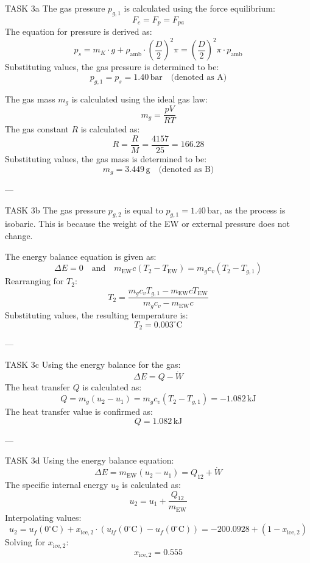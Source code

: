 TASK 3a  
The gas pressure \( p_{g,1} \) is calculated using the force equilibrium:  
\[
F_c = F_p = F_{pa}
\]  
The equation for pressure is derived as:  
\[
p_s = m_K \cdot g + \rho_{\text{amb}} \cdot \left( \frac{D}{2} \right)^2 \pi = \left( \frac{D}{2} \right)^2 \pi \cdot p_{\text{amb}}
\]  
Substituting values, the gas pressure is determined to be:  
\[
p_{g,1} = p_s = 1.40 \, \text{bar} \quad \text{(denoted as A)}  
\]  

The gas mass \( m_g \) is calculated using the ideal gas law:  
\[
m_g = \frac{p V}{R T}  
\]  
The gas constant \( R \) is calculated as:  
\[
R = \frac{R}{M} = \frac{4157}{25} = 166.28  
\]  
Substituting values, the gas mass is determined to be:  
\[
m_g = 3.449 \, \text{g} \quad \text{(denoted as B)}  
\]  

---

TASK 3b  
The gas pressure \( p_{g,2} \) is equal to \( p_{g,1} = 1.40 \, \text{bar} \), as the process is isobaric. This is because the weight of the EW or external pressure does not change.  

The energy balance equation is given as:  
\[
\Delta E = 0 \quad \text{and} \quad m_{\text{EW}} c (T_2 - T_{\text{EW}}) = m_g c_v (T_2 - T_{g,1})  
\]  
Rearranging for \( T_2 \):  
\[
T_2 = \frac{m_g c_v T_{g,1} - m_{\text{EW}} c T_{\text{EW}}}{m_g c_v - m_{\text{EW}} c}  
\]  
Substituting values, the resulting temperature is:  
\[
T_2 = 0.003^\circ \text{C}  
\]  

---

TASK 3c  
Using the energy balance for the gas:  
\[
\Delta E = Q - \dot{W}  
\]  
The heat transfer \( Q \) is calculated as:  
\[
Q = m_g (u_2 - u_1) = m_g c_v (T_2 - T_{g,1}) = -1.082 \, \text{kJ}  
\]  
The heat transfer value is confirmed as:  
\[
Q = 1.082 \, \text{kJ}  
\]  

---

TASK 3d  
Using the energy balance equation:  
\[
\Delta E = m_{\text{EW}} (u_2 - u_1) = Q_{12} + \dot{W}  
\]  
The specific internal energy \( u_2 \) is calculated as:  
\[
u_2 = u_1 + \frac{Q_{12}}{m_{\text{EW}}}  
\]  
Interpolating values:  
\[
u_2 = u_f(0^\circ\text{C}) + x_{\text{ice},2} \cdot (u_{lf}(0^\circ\text{C}) - u_f(0^\circ\text{C})) = -200.0928 + (1 - x_{\text{ice},2})  
\]  
Solving for \( x_{\text{ice},2} \):  
\[
x_{\text{ice},2} = 0.555  
\]  